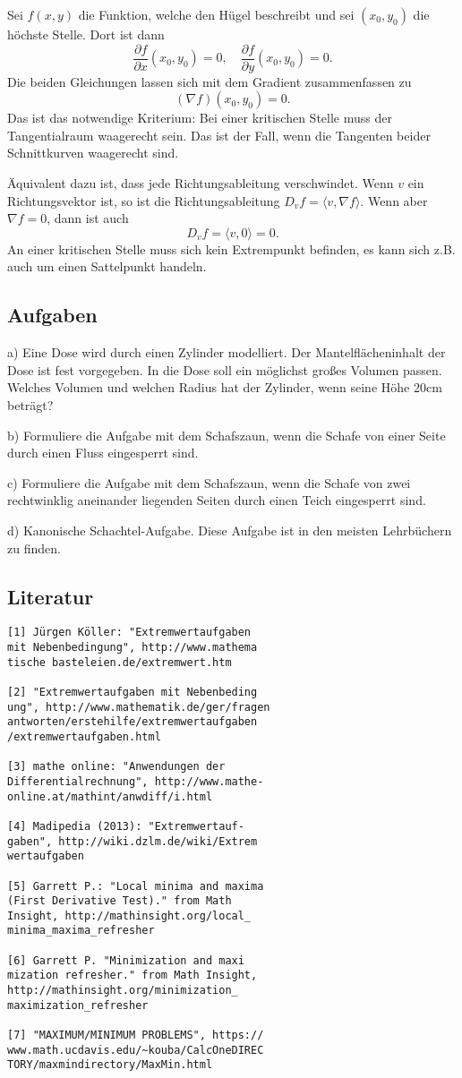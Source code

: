 \documentclass[a4paper,11pt,fleqn,twocolumn]{article}
\begin{document}
Sei \(f(x,y)\) die Funktion, welche den Hügel beschreibt und sei
\((x_0,y_0)\) die höchste Stelle. Dort ist dann
\[\frac{\partial f}{\partial x}(x_0,y_0)=0,\quad
\frac{\partial f}{\partial y}(x_0,y_0)=0.\]
Die beiden Gleichungen lassen sich mit dem Gradient zusammenfassen
zu
\[(\nabla f)(x_0,y_0)=0.\]
Das ist das notwendige Kriterium: Bei einer kritischen Stelle
muss der Tangentialraum waagerecht sein. Das ist der Fall, wenn
die Tangenten beider Schnittkurven waagerecht sind.

Äquivalent dazu ist, dass jede Richtungsableitung verschwindet.
Wenn \(v\) ein Richtungsvektor ist, so ist die Richtungsableitung
\(D_vf = \langle v,\nabla f\rangle\). Wenn aber \(\nabla f=0\),
dann ist auch
\[D_v f = \langle v,0\rangle = 0.\]
An einer kritischen Stelle muss sich kein Extrempunkt befinden,
es kann sich z.B. auch um einen Sattelpunkt handeln.

\subsection*{Aufgaben}

a) Eine Dose wird durch einen Zylinder modelliert.
Der Mantelflächeninhalt der Dose ist fest vorgegeben.
In die Dose soll ein möglichst großes Volumen passen.
Welches Volumen und welchen Radius hat der Zylinder, wenn seine
Höhe 20cm beträgt?

b) Formuliere die Aufgabe mit dem Schafszaun, wenn die Schafe von
einer Seite durch einen Fluss eingesperrt sind.

c) Formuliere die Aufgabe mit dem Schafszaun, wenn die Schafe
von zwei rechtwinklig aneinander liegenden Seiten durch einen
Teich eingesperrt sind.

d) Kanonische Schachtel-Aufgabe. Diese Aufgabe ist in den meisten
Lehrbüchern zu finden.

\subsection*{Literatur}

\begin{verbatim}
[1] Jürgen Köller: "Extremwertaufgaben
mit Nebenbedingung", http://www.mathema
tische basteleien.de/extremwert.htm

[2] "Extremwertaufgaben mit Nebenbeding
ung", http://www.mathematik.de/ger/fragen
antworten/erstehilfe/extremwertaufgaben
/extremwertaufgaben.html

[3] mathe online: "Anwendungen der
Differentialrechnung", http://www.mathe-
online.at/mathint/anwdiff/i.html

[4] Madipedia (2013): "Extremwertauf-
gaben", http://wiki.dzlm.de/wiki/Extrem
wertaufgaben

[5] Garrett P.: "Local minima and maxima
(First Derivative Test)." from Math
Insight, http://mathinsight.org/local_
minima_maxima_refresher

[6] Garrett P. "Minimization and maxi
mization refresher." from Math Insight,
http://mathinsight.org/minimization_
maximization_refresher

[7] "MAXIMUM/MINIMUM PROBLEMS", https://
www.math.ucdavis.edu/~kouba/CalcOneDIREC
TORY/maxmindirectory/MaxMin.html
\end{verbatim}
\end{document}
